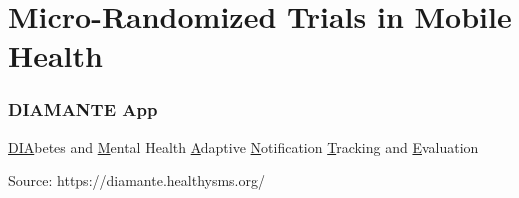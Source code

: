 \documentclass[10pt,xcolor=dvipsnames]{beamer}
\begin{document}
%
%
%
%



\section{Micro-Randomized Trials in Mobile Health}

\begin{frame}
\frametitle{DIAMANTE App}
\begin{center}
\underline{DIA}betes and \underline{M}ental Health \underline{A}daptive \underline{N}otification \underline{T}racking and \underline{E}valuation
\begin{figure}
\end{figure}
Source: {\color{blue}https://diamante.healthysms.org/}
\end{center}
\end{frame}
\end{document}
